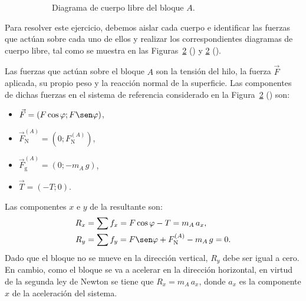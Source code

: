 \documentclass[addpoints]{exam}
\begin{document}
\begin{questions}
\begin{figure}[h]
\begin{subfigure}{0.45\textwidth}
            \caption{Diagrama de cuerpo libre del bloque $A$.}
            \label{fig:vinculados3_DCLA}
        \end{subfigure}
        \caption{}
        \label{fig:vinculados3}
    \end{figure}

    \begin{solution}
        Para resolver este ejercicio, debemos aislar cada cuerpo e identificar las fuerzas que actúan sobre cada uno de ellos y realizar los correspondientes diagramas de cuerpo libre, tal como se muestra en las Figuras~\ref{fig:vinculados3} () y \ref{fig:vinculados3} ().

        Las fuerzas que actúan sobre el bloque $A$ son la tensión del hilo, la fuerza $\vec{F}$ aplicada, su propio peso y la reacción normal de la superficie. Las componentes de dichas fuerzas en el sistema de referencia considerado en la Figura~\ref{fig:vinculados3} () son:
        \begin{itemize}
            \item $\vec{F} = \left(F \cos \varphi; F \sen \varphi\right)$,
            \item $\vec{F}_\text{N}^{(A)} = \left(0; F_\text{N}^{(A)}\right)$,
            \item $\vec{F}_\text{g}^{(A)} = \left(0; - m_A \, g\right)$,
            \item $\vec{T} = \left(-T;0\right)$.
        \end{itemize} Las componentes $x$ e $y$ de la resultante son:
        \begin{align}
            R_x &= \sum f_x = F \cos \varphi - T = m_A \, a_x, \label{ec:sumfxA} \\
            R_y &= \sum f_y = F \sen \varphi + F_\text{N}^{(A)} - m_A \, g = 0. \label{ec:sumfyA}
        \end{align} Dado que el bloque no se mueve en la dirección vertical, $R_y$ debe ser igual a cero. En cambio, como el bloque se va a acelerar en la dirección horizontal, en virtud de la segunda ley de Newton se tiene que $R_x = m_A \, a_x$, donde $a_x$ es la componente $x$ de la aceleración del sistema.


\end{solution}
\end{questions}
\end{document}
